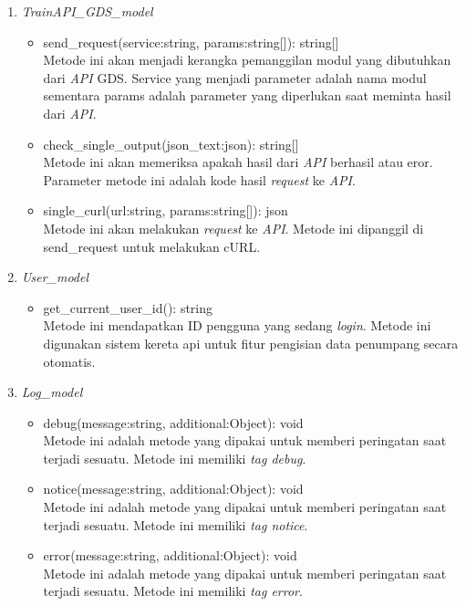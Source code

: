 \begin{enumerate}
    \item \textit{TrainAPI\_GDS\_model}
    \begin{itemize}
        \item send\_request(service:string, params:string[]): string[]\\
        Metode ini akan menjadi kerangka pemanggilan modul yang dibutuhkan dari \textit{API} GDS. Service yang menjadi parameter adalah nama modul sementara params adalah parameter yang diperlukan saat meminta hasil dari \textit{API}.
        \item check\_single\_output(json\_text:json): string[]\\
        Metode ini akan memeriksa apakah hasil dari \textit{API} berhasil atau eror. Parameter metode ini adalah kode hasil \textit{request} ke \textit{API}.
        \item single\_curl(url:string, params:string[]): json\\
        Metode ini akan melakukan \textit{request} ke \textit{API}. Metode ini dipanggil di send\_request untuk melakukan cURL.
    \end{itemize}
    
    \item \textit{User\_model}
    \begin{itemize}
        \item get\_current\_user\_id(): string\\
        Metode ini mendapatkan ID pengguna yang sedang \textit{login}. Metode ini digunakan sistem kereta api untuk fitur pengisian data penumpang secara otomatis.
    \end{itemize}
    
    \item \textit{Log\_model}
    \begin{itemize}
        \item debug(message:string, additional:Object): void\\
        Metode ini adalah metode yang dipakai untuk memberi peringatan saat terjadi sesuatu. Metode ini memiliki \textit{tag debug}.
        
        \item notice(message:string, additional:Object): void\\
        Metode ini adalah metode yang dipakai untuk memberi peringatan saat terjadi sesuatu. Metode ini memiliki \textit{tag notice}.
        
        \item error(message:string, additional:Object): void\\
        Metode ini adalah metode yang dipakai untuk memberi peringatan saat terjadi sesuatu. Metode ini memiliki \textit{tag error}.
       

\end{itemize}
\end{enumerate}
